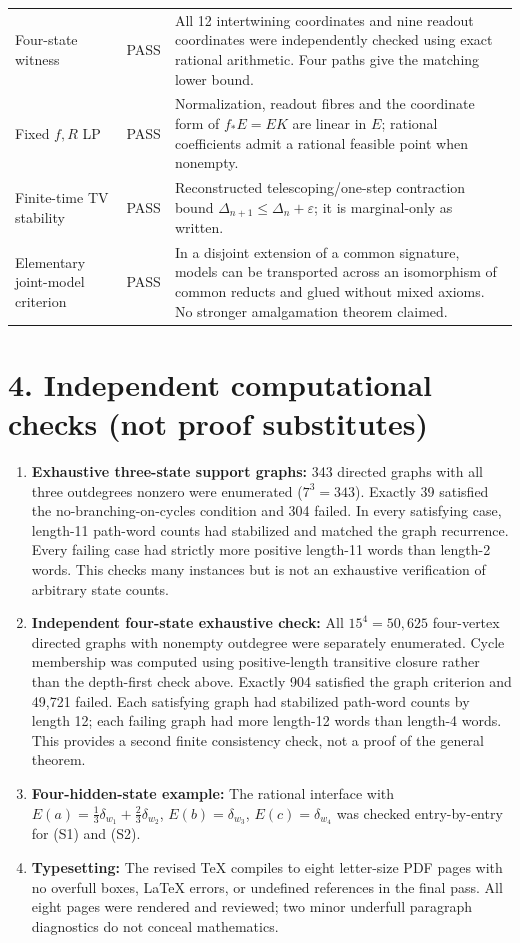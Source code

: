\documentclass[11pt,letterpaper]{article}
\begin{document}
\begin{longtable}{@{}p{.30\linewidth}p{.14\linewidth}p{.49\linewidth}@{}}
Four-state witness & PASS & All 12 intertwining coordinates and nine readout coordinates were independently checked using exact rational arithmetic. Four paths give the matching lower bound.\\
Fixed $f,R$ LP & PASS & Normalization, readout fibres and the coordinate form of $f_*E=EK$ are linear in $E$; rational coefficients admit a rational feasible point when nonempty.\\
Finite-time TV stability & PASS & Reconstructed telescoping/one-step contraction bound $\Delta_{n+1}\le\Delta_n+\varepsilon$; it is marginal-only as written.\\
Elementary joint-model criterion & PASS & In a disjoint extension of a common signature, models can be transported across an isomorphism of common reducts and glued without mixed axioms. No stronger amalgamation theorem claimed.\\
\bottomrule
\end{longtable}
\normalsize

\section*{4. Independent computational checks (not proof substitutes)}
\begin{enumerate}
\item \textbf{Exhaustive three-state support graphs:} 343 directed graphs with all three outdegrees nonzero were enumerated ($7^3=343$). Exactly 39 satisfied the no-branching-on-cycles condition and 304 failed. In every satisfying case, length-11 path-word counts had stabilized and matched the graph recurrence. Every failing case had strictly more positive length-11 words than length-2 words. This checks many instances but is not an exhaustive verification of arbitrary state counts.
\item \textbf{Independent four-state exhaustive check:} All $15^4=50{,}625$ four-vertex directed graphs with nonempty outdegree were separately enumerated. Cycle membership was computed using positive-length transitive closure rather than the depth-first check above. Exactly 904 satisfied the graph criterion and 49,721 failed. Each satisfying graph had stabilized path-word counts by length 12; each failing graph had more length-12 words than length-4 words. This provides a second finite consistency check, not a proof of the general theorem.
    \item \textbf{Four-hidden-state example:} The rational interface with $E(a)=\tfrac13\delta_{w_1}+\tfrac23\delta_{w_2}$, $E(b)=\delta_{w_3}$, $E(c)=\delta_{w_4}$ was checked entry-by-entry for (S1) and (S2).
\item \textbf{Typesetting:} The revised TeX compiles to eight letter-size PDF pages with no overfull boxes, LaTeX errors, or undefined references in the final pass. All eight pages were rendered and reviewed; two minor underfull paragraph diagnostics do not conceal mathematics.
\end{enumerate}
\end{document}
